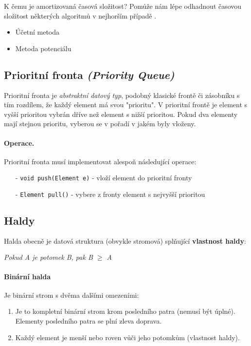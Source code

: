 K čemu je amortizovaná časová složitost? Pomůže nám lépe odhadnout časovou složitost některých algoritmů v nejhorším případě \cite{algoritmyeu:amortizovana}.

\begin{itemize}[itemsep=0pt, topsep=0pt]
    \item Účetní metoda
     \item Metoda potenciálu
\end{itemize}

\subsection*{Prioritní fronta \textit{(Priority Queue)}}
Prioritní fronta je \textit{abstraktní datový typ}, podobný klasické frontě či zásobníku s tím rozdílem, že každý element má svou "prioritu". V prioritní frontě je element s vyšší prioritou vybrán dříve než element s nižší prioritou. Pokud dva elementy mají stejnou prioritu, vyberou se v pořadí v jakém byly vloženy.

\paragraph{Operace.} Prioritní fronta musí implementovat alespoň následující operace:

\begin{itemize}[itemsep=0pt, topsep=2pt]
    \item[-] \texttt{void push(Element e)} - vloží element do prioritní fronty
    \item[-] \texttt{Element pull()} - vybere z fronty element s nejvyšší prioritou
\end{itemize}

\subsection*{Haldy}
Halda obecně je datová struktura (obvykle stromová) splňující \textbf{vlastnost haldy}:

\begin{center}
    \textit{Pokud A je potomek B, pak B $\geq$ A}
\end{center}

\paragraph{Binární halda} Je binární strom s dvěma dalšími omezeními:

\begin{enumerate}[itemsep=0pt, topsep=2pt]
    \item Je to kompletní binární strom krom posledního patra (nemusí být úplné). Elementy posledního patra se plní zleva doprava.
    \item Každý element je menší nebo roven vůči jeho potomkům (vlastnost haldy).
\end{enumerate}

